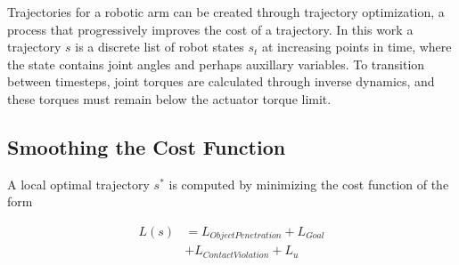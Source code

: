 \documentclass[../thesis.tex]{subfiles}
\begin{document}
  


Trajectories for a robotic arm can be created through trajectory optimization, a process that progressively improves the cost of a trajectory.
In this work a trajectory $s$ is a discrete list of robot states $s_t$ at increasing points in time, where the state contains joint angles and perhaps auxillary variables.
To transition between timesteps, joint torques are calculated through inverse dynamics, and these torques must remain below the actuator torque limit.










\subsection{Smoothing the Cost Function} \label{sec:smoothing}
A local optimal trajectory $s^*$ is computed by minimizing the cost function of the form

\begin{align}
L(s) &= L_{Object Penetration} + L_{Goal} \nonumber \\
&+   L_{Contact Violation} + L_{u}  \label{eq:cost}
\end{align}
    
\end{document}
